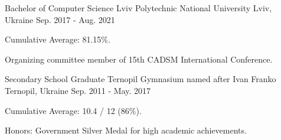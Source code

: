

\begin{cventries}

  \cventry
    {Bachelor of Computer Science} %
    {Lviv Polytechnic National University} %
    {Lviv, Ukraine} %
    {Sep. 2017 - Aug. 2021} %
    {
      \begin{cvitems} %
        \item {Cumulative Average: 81.15\%.}
        \item {Organizing committee member of 15th CADSM International Conference.}
      \end{cvitems}
    }

  \cventry
    {Secondary School Graduate} %
    {Ternopil Gymnasium named after Ivan Franko} %
    {Ternopil, Ukraine} %
    {Sep. 2011 - May. 2017} %
    {
      \begin{cvitems} %
        \item {Cumulative Average: 10.4 / 12 (86\%).}
        \item {Honors: Government Silver Medal for high academic achievements.}
      \end{cvitems}
    }

\end{cventries}
